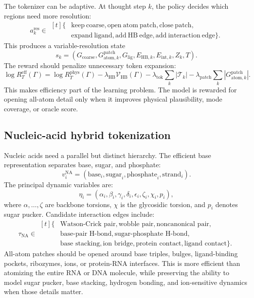 \documentclass[11pt]{article}
\begin{document}
The tokenizer can be adaptive. At thought step $k$, the policy decides which regions need more resolution:
\[
a_k^{\mathrm{res}}
\in
\begin{aligned}[t]
\{&
\mathrm{keep\ coarse},\mathrm{open\ atom\ patch},
\mathrm{close\ patch},\\
&\mathrm{expand\ ligand},\mathrm{add\ HB\ edge},
\mathrm{add\ interaction\ edge}\}.
\end{aligned}
\]
This produces a variable-resolution state
\[
s_k=(G_{\mathrm{coarse}},G_{\mathrm{atom},k}^{\mathrm{patch}},G_{\mathrm{lig}},E_{\mathrm{HB},k},E_{\mathrm{int},k},Z_k,T).
\]
The reward should penalize unnecessary token expansion:
\[
\log R_T^{\mathrm{eff}}(\Gamma)
=
\log R_T^{\mathrm{phys}}(\Gamma)
-\lambda_{\mathrm{HB}}\mathcal{V}_{\mathrm{HB}}(\Gamma)
-\lambda_{\mathrm{tok}}\sum_k |\mathcal{T}_k|
-\lambda_{\mathrm{patch}}\sum_k |G_{\mathrm{atom},k}^{\mathrm{patch}}|.
\]
This makes efficiency part of the learning problem. The model is rewarded for opening all-atom detail only when it improves physical plausibility, mode coverage, or oracle score.

\subsection{Nucleic-acid hybrid tokenization}

Nucleic acids need a parallel but distinct hierarchy. The efficient base representation separates base, sugar, and phosphate:
\[
v_i^{\mathrm{NA}}
=
(\text{base}_i,\text{sugar}_i,\text{phosphate}_i,\text{strand}_i).
\]
The principal dynamic variables are:
\[
\eta_i=
(\alpha_i,\beta_i,\gamma_i,\delta_i,\epsilon_i,\zeta_i,\chi_i,p_i),
\]
where $\alpha,\dots,\zeta$ are backbone torsions, $\chi$ is the glycosidic torsion, and $p_i$ denotes sugar pucker. Candidate interaction edges include:
\[
\tau_{\mathrm{NA}}
\in
\begin{aligned}[t]
\{&
\text{Watson-Crick pair},\text{wobble pair},
\text{noncanonical pair},\\
&\text{base-pair H-bond},\text{sugar-phosphate H-bond},\\
&\text{base stacking},\text{ion bridge},
\text{protein contact},\text{ligand contact}\}.
\end{aligned}
\]
All-atom patches should be opened around base triples, bulges, ligand-binding pockets, ribozymes, ions, or protein-RNA interfaces. This is more efficient than atomizing the entire RNA or DNA molecule, while preserving the ability to model sugar pucker, base stacking, hydrogen bonding, and ion-sensitive dynamics when those details matter.
\end{document}
